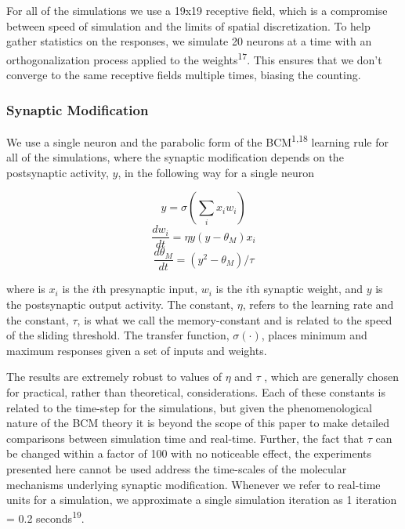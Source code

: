 \documentclass[
]{article}
\begin{document}
For all of the simulations we use a 19x19 receptive field, which is a
compromise between speed of simulation and the limits of spatial
discretization. To help gather statistics on the responses, we simulate
20 neurons at a time with an orthogonalization process applied to the
weights\textsuperscript{17}. This ensures that we don't converge to the
same receptive fields multiple times, biasing the counting.

\subsubsection{Synaptic Modification}\label{sec:synaptic-modification}

We use a single neuron and the parabolic form of the
BCM\textsuperscript{1,18} learning rule for all of the simulations,
where the synaptic modification depends on the postsynaptic activity,
\(y\), in the following way for a single neuron

\[
y=\sigma\left(\sum_i x_i w_i \right)
\] \[
\frac{dw_i}{dt} = \eta y(y-\theta_M) x_i
\] \[
\frac{d\theta_M}{dt} = (y^2-\theta_M)/\tau
\]

where is \(x_i\) is the \(i\)th presynaptic input, \(w_i\) is the
\(i\)th synaptic weight, and \(y\) is the postsynaptic output activity.
The constant, \(\eta\), refers to the learning rate and the constant,
\(\tau\), is what we call the memory-constant and is related to the
speed of the sliding threshold. The transfer function,
\(\sigma(\cdot)\), places minimum and maximum responses given a set of
inputs and weights.

The results are extremely robust to values of \(\eta\) and \(\tau\) ,
which are generally chosen for practical, rather than theoretical,
considerations. Each of these constants is related to the time-step for
the simulations, but given the phenomenological nature of the BCM theory
it is beyond the scope of this paper to make detailed comparisons
between simulation time and real-time. Further, the fact that \(\tau\)
can be changed within a factor of 100 with no noticeable effect, the
experiments presented here cannot be used address the time-scales of the
molecular mechanisms underlying synaptic modification. Whenever we refer
to real-time units for a simulation, we approximate a single simulation
iteration as 1 iteration = 0.2 seconds\textsuperscript{19}.
\end{document}
